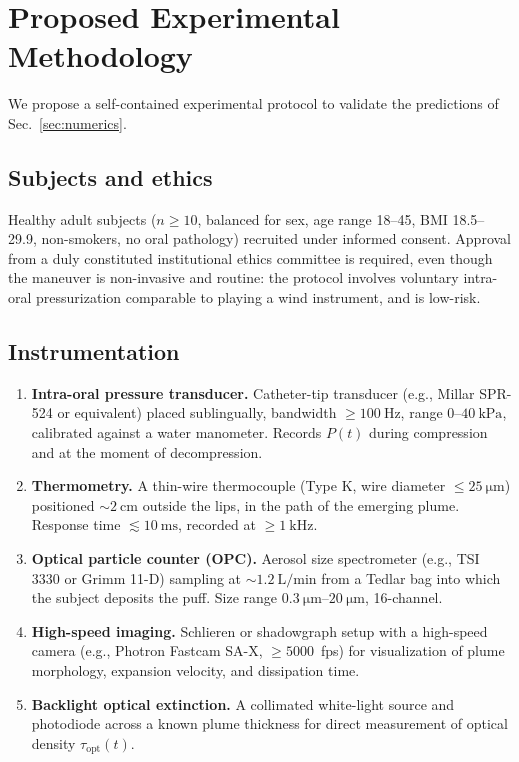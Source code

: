 \documentclass[11pt,a4paper]{article}
\theoremstyle{definition}
\theoremstyle{plain}
\begin{document}
\section{Proposed Experimental Methodology}
\label{sec:experiment}

We propose a self-contained experimental protocol to validate the predictions of Sec.~\ref{sec:numerics}.

\subsection{Subjects and ethics}
Healthy adult subjects ($n \ge 10$, balanced for sex, age range 18–45, BMI 18.5–29.9, non-smokers, no oral pathology) recruited under informed consent. Approval from a duly constituted institutional ethics committee is required, even though the maneuver is non-invasive and routine: the protocol involves voluntary intra-oral pressurization comparable to playing a wind instrument, and is low-risk.

\subsection{Instrumentation}

\begin{enumerate}
\item \textbf{Intra-oral pressure transducer.} Catheter-tip transducer (e.g., Millar SPR-524 or equivalent) placed sublingually, bandwidth $\ge \SI{100}{\hertz}$, range $0\text{--}\SI{40}{\kilo\pascal}$, calibrated against a water manometer. Records $P(t)$ during compression and at the moment of decompression.
\item \textbf{Thermometry.} A thin-wire thermocouple (Type K, wire diameter $\le \SI{25}{\micro\meter}$) positioned $\sim\!\SI{2}{\centi\meter}$ outside the lips, in the path of the emerging plume. Response time $\lesssim \SI{10}{\milli\second}$, recorded at $\ge \SI{1}{\kilo\hertz}$.
\item \textbf{Optical particle counter (OPC).} Aerosol size spectrometer (e.g., TSI 3330 or Grimm 11-D) sampling at $\sim\!\SI{1.2}{\liter\per\minute}$ from a Tedlar bag into which the subject deposits the puff. Size range $\SIrange{0.3}{20}{\micro\meter}$, 16-channel.
\item \textbf{High-speed imaging.} Schlieren or shadowgraph setup with a high-speed camera (e.g., Photron Fastcam SA-X, $\ge 5000$~fps) for visualization of plume morphology, expansion velocity, and dissipation time.
\item \textbf{Backlight optical extinction.} A collimated white-light source and photodiode across a known plume thickness for direct measurement of optical density $\tau_{\text{opt}}(t)$.
\end{enumerate}
\end{document}
